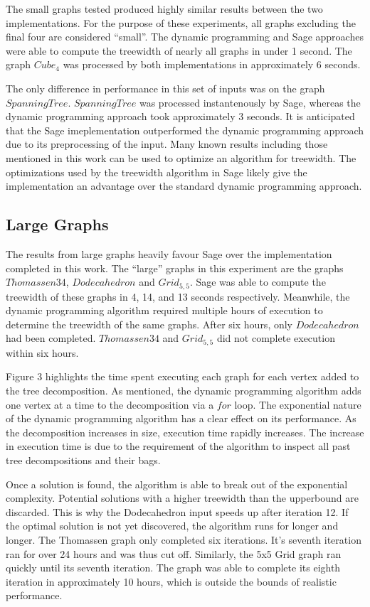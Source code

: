 \documentclass[12pt,conference]{IEEEtran}
\theoremstyle{plain}
\begin{document}
The small graphs tested produced highly similar results between the two implementations. For the purpose of these experiments, all graphs excluding the final four are considered ``small''. The dynamic programming and Sage approaches were able to compute the treewidth of nearly all graphs in under 1 second. The graph $Cube_{4}$ was processed by both implementations in approximately 6 seconds.

The only difference in performance in this set of inputs was on the graph $Spanning Tree$. $Spanning Tree$ was processed instantenously by Sage, whereas the dynamic programming approach took approximately 3 seconds. It is anticipated that the Sage imeplementation outperformed the dynamic programming approach due to its preprocessing of the input. Many known results including those mentioned in this work can be used to optimize an algorithm for treewidth. The optimizations used by the treewidth algorithm in Sage likely give the implementation an advantage over the standard dynamic programming approach.

\subsection{Large Graphs}

The results from large graphs heavily favour Sage over the implementation completed in this work. The ``large'' graphs in this experiment are the graphs $Thomassen34$, $Dodecahedron$ and $Grid_{5,5}$. Sage was able to compute the treewidth of these graphs in 4, 14, and 13 seconds respectively. Meanwhile, the dynamic programming algorithm required multiple hours of execution to determine the treewidth of the same graphs. After six hours, only $Dodecahedron$ had been completed. $Thomassen34$ and $Grid_{5,5}$ did not complete execution within six hours.

Figure 3 highlights the time spent executing each graph for each vertex added to the tree decomposition. As mentioned, the dynamic programming algorithm adds one vertex at a time to the decomposition via a $for$ loop. The exponential nature of the dynamic programming algorithm has a clear effect on its performance. As the decomposition increases in size, execution time rapidly increases. The increase in execution time is due to the requirement of the algorithm to inspect all past tree decompositions and their bags.

Once a solution is found, the algorithm is able to break out of the exponential complexity. Potential solutions with a higher treewidth than the upperbound are discarded. This is why the Dodecahedron input speeds up after iteration 12. If the optimal solution is not yet discovered, the algorithm runs for longer and longer. The Thomassen graph only completed six iterations. It's seventh iteration ran for over 24 hours and was thus cut off. Similarly, the 5x5 Grid graph ran quickly until its seventh iteration. The graph was able to complete its eighth iteration in approximately 10 hours, which is outside the bounds of realistic performance.
\end{document}
